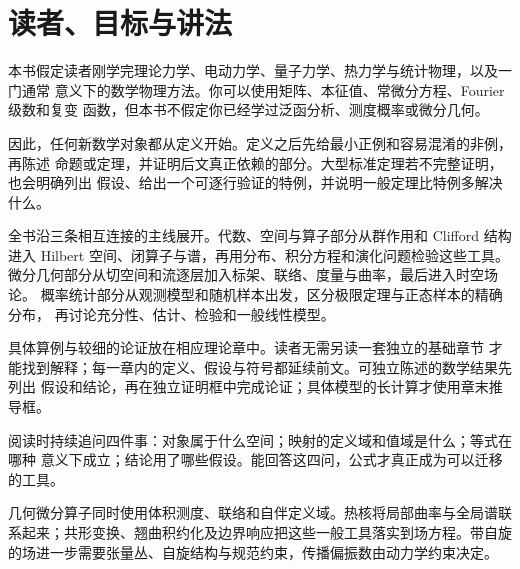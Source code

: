 \chapter*{读者、目标与讲法}

本书假定读者刚学完理论力学、电动力学、量子力学、热力学与统计物理，以及一门通常
意义下的数学物理方法。你可以使用矩阵、本征值、常微分方程、Fourier 级数和复变
函数，但本书不假定你已经学过泛函分析、测度概率或微分几何。

因此，任何新数学对象都从定义开始。定义之后先给最小正例和容易混淆的非例，再陈述
命题或定理，并证明后文真正依赖的部分。大型标准定理若不完整证明，也会明确列出
假设、给出一个可逐行验证的特例，并说明一般定理比特例多解决什么。

全书沿三条相互连接的主线展开。代数、空间与算子部分从群作用和 Clifford
结构进入 Hilbert 空间、闭算子与谱，再用分布、积分方程和演化问题检验这些工具。
微分几何部分从切空间和流逐层加入标架、联络、度量与曲率，最后进入时空场论。
概率统计部分从观测模型和随机样本出发，区分极限定理与正态样本的精确分布，
再讨论充分性、估计、检验和一般线性模型。

具体算例与较细的论证放在相应理论章中。读者无需另读一套独立的基础章节
才能找到解释；每一章内的定义、假设与符号都延续前文。可独立陈述的数学结果先列出
假设和结论，再在独立证明框中完成论证；具体模型的长计算才使用章末推导框。

阅读时持续追问四件事：对象属于什么空间；映射的定义域和值域是什么；等式在哪种
意义下成立；结论用了哪些假设。能回答这四问，公式才真正成为可以迁移的工具。

几何微分算子同时使用体积测度、联络和自伴定义域。热核将局部曲率与全局谱联系起来；共形变换、翘曲积约化及边界响应把这些一般工具落实到场方程。带自旋的场进一步需要张量丛、自旋结构与规范约束，传播偏振数由动力学约束决定。
